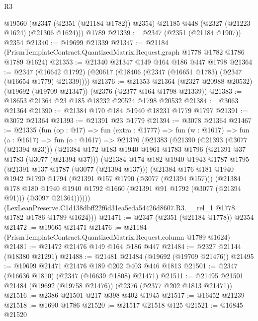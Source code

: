 \begin{lexlean}{R3}
\begin{coremodule}
    @19560 (@2347 (@2351 (@21184 @1782)) @2354) @21185 @448 (@2327 (@21223 @1624) (@21306 @1624)))
    @1789
@21339 := @2347 (@2351 (@21184 @1907)) @2354
@21340 := @19699 @21339
@21347 := @21184 (PrismTemplateContract.QuantizedMatrix.Request.graph @1778 @1782 @1786 @1789 @1624)
@21353 := @21340 @21347 @149 @164 @186 @447 @1798
@21364 := @2347
    (@16642 @1792)
    (@20617 (@18406 (@2347 (@16651 @1783) (@2347 (@16654 @1779) @21339))))
@21376 := @21353
    @21364
    (@2327 @20988 @20532)
    (@19692 (@19709 @21347))
    (@2376 (@2377 @164 @1798 @21339))
@21383 := @18653 @21364 @23 @185 @18232 @20524 @1798 @20532
@21384 := @3063 @21364
@21390 := @21384 @170 @184 @1940 @18231 @1779 @1797
@21391 := @3072 @21364
@21393 := @21391 @23 @1779
@21394 := @3078 @21364
@21467 := @21335
    (fun (op : @17) =>
    fun (extra : @1777) =>
    fun (w : @1617) =>
    fun (a : @1617) =>
    fun (o : @1617) =>
    @21376
      (@21383
        (@21390
          (@21393 (@3077 (@21394 @23)))
          (@21384
            @172
            @183
            @1940
            @1961
            @1783
            @1796
            (@21391 @37 @1783 (@3077 (@21394 @37)))
            (@21384
              @174
              @182
              @1940
              @1943
              @1787
              @1795
              (@21391 @137 @1787 (@3077 (@21394 @137)))
              (@21384
                @176
                @181
                @1940
                @1942
                @1790
                @1794
                (@21391 @157 @1790 (@3077 (@21394 @157)))
                (@21384
                  @178
                  @180
                  @1940
                  @1940
                  @1792
                  @1660
                  (@21391 @91 @1792 (@3077 (@21394 @91)))
                  (@3097 @21364))))))
        (LexLeanPreserve.C1d138dbff22f6d31ea5eda54426d8607.R3.__rel_1
          @1778
          @1782
          @1786
          @1789
          @1624)))
@21471 := @2347 (@2351 (@21184 @1778)) @2354
@21472 := @19665 @21471
@21476 := @21184 (PrismTemplateContract.QuantizedMatrix.Request.column @1789 @1624)
@21481 := @21472 @21476 @149 @164 @186 @447
@21484 := @2327 @21144 (@18380 @21291)
@21488 := @21481 @21484 (@19692 (@19709 @21476))
@21495 := @19699 @21471 @21476 @189 @202 @403 @446 @1813
@21501 := @2347 (@16636 @1810) (@2347 (@16639 @1808) @21471)
@21511 := @21495 @21501 @21484 (@19692 (@19758 @21476)) (@2376 (@2377 @202 @1813 @21471))
@21516 := @2386 @21501 @217 @398 @402 @1945
@21517 := @16452 @21239
@21518 := @1690 @1786
@21520 := @21517 @21518 @125
@21521 := @16845 @21520

\end{coremodule}
\end{lexlean}
